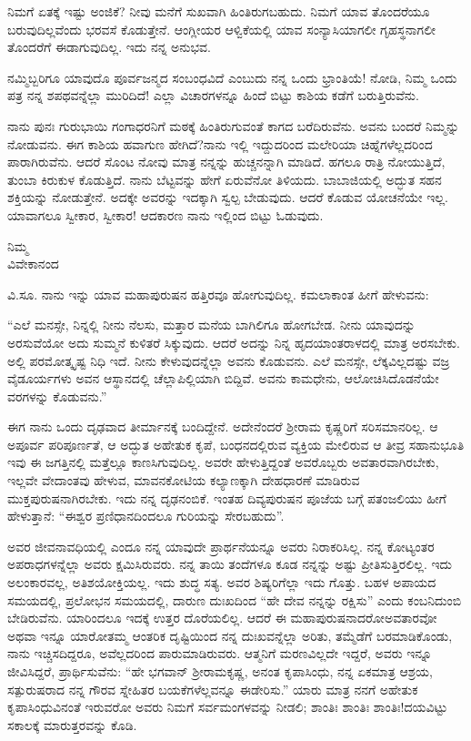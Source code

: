 ನಿಮಗೆ ಏತಕ್ಕೆ ಇಷ್ಟು ಅಂಜಿಕೆ? ನೀವು ಮನೆಗೆ ಸುಖವಾಗಿ ಹಿಂತಿರುಗಬಹುದು. ನಿಮಗೆ ಯಾವ ತೊಂದರೆಯೂ ಬರುವುದಿಲ್ಲವೆಂದು ಭರವಸೆ ಕೊಡುತ್ತೇನೆ. ಆಂಗ್ಲೀಯರ ಆಳ್ವಿಕೆಯಲ್ಲಿ ಯಾವ ಸಂನ್ಯಾಸಿಯಾಗಲೀ ಗೃಹಸ್ಥನಾಗಲೀ ತೊಂದರೆಗೆ ಈಡಾಗುವುದಿಲ್ಲ. ಇದು ನನ್ನ ಅನುಭವ.

ನಮ್ಮಿಬ್ಬರಿಗೂ ಯಾವುದೊ ಪೂರ್ವಜನ್ಮದ ಸಂಬಂಧವಿದೆ ಎಂಬುದು ನನ್ನ ಒಂದು ಭ್ರಾಂತಿಯೆ! ನೋಡಿ, ನಿಮ್ಮ ಒಂದು ಪತ್ರ ನನ್ನ ಶಪಥವನ್ನೆಲ್ಲಾ ಮುರಿದಿದೆ! ಎಲ್ಲಾ ವಿಚಾರಗಳನ್ನೂ ಹಿಂದೆ ಬಿಟ್ಟು ಕಾಶಿಯ ಕಡೆಗೆ ಬರುತ್ತಿರುವೆನು.

ನಾನು ಪುನಃ ಗುರುಭಾಯಿ ಗಂಗಾಧರನಿಗೆ ಮಠಕ್ಕೆ ಹಿಂತಿರುಗುವಂತೆ ಕಾಗದ ಬರೆದಿರುವೆನು. ಅವನು ಬಂದರೆ ನಿಮ್ಮನ್ನು ನೋಡುವನು. ಈಗ ಕಾಶಿಯ ಹವಾಗುಣ ಹೇಗಿದೆ?ನಾನು ಇಲ್ಲಿ ಇದ್ದುದರಿಂದ ಮಲೇರಿಯಾ ಚಿಹ್ನೆಗಳೆಲ್ಲದರಿಂದ ಪಾರಾಗಿರುವೆನು. ಆದರೆ ಸೊಂಟ ನೋವು ಮಾತ್ರ ನನ್ನನ್ನು ಹುಚ್ಚನನ್ನಾಗಿ ಮಾಡಿದೆ. ಹಗಲೂ ರಾತ್ರಿ ನೋಯುತ್ತಿದೆ, ತುಂಬಾ ಕಿರುಕುಳ ಕೊಡುತ್ತಿದೆ. ನಾನು ಬೆಟ್ಟವನ್ನು ಹೇಗೆ ಏರುವೆನೋ ತಿಳಿಯದು. ಬಾಬಾಜಿಯಲ್ಲಿ ಅದ್ಭುತ ಸಹನ ಶಕ್ತಿಯನ್ನು ನೋಡುತ್ತೇನೆ. ಅದಕ್ಕೇ ಅವರನ್ನು ಇದಕ್ಕಾಗಿ ಸ್ವಲ್ಪ ಬೇಡುವುದು. ಆದರೆ ಕೊಡುವ ಯೋಚನೆಯೇ ಇಲ್ಲ. ಯಾವಾಗಲೂ ಸ್ವೀಕಾರ, ಸ್ವೀಕಾರ! ಆದಕಾರಣ ನಾನು ಇಲ್ಲಿಂದ ಬಿಟ್ಟು ಓಡುವುದು.
\vspace{-0.3cm}

{\flushright
ನಿಮ್ಮ\\ವಿವೇಕಾನಂದ\par}

ವಿ.ಸೂ. \enginline{-}ನಾನು ಇನ್ನು ಯಾವ ಮಹಾಪುರುಷನ ಹತ್ತಿರವೂ ಹೋಗುವುದಿಲ್ಲ. ಕಮಲಾಕಾಂತ ಹೀಗೆ ಹೇಳುವನು:

“ಎಲೆ ಮನಸ್ಸೇ, ನಿನ್ನಲ್ಲಿ ನೀನು ನೆಲಸು, ಮತ್ತಾರ ಮನೆಯ ಬಾಗಿಲಿಗೂ ಹೋಗಬೇಡ. ನೀನು ಯಾವುದನ್ನು ಅರಸುವೆಯೋ ಅದು ಸುಮ್ಮನೆ ಕುಳಿತರೆ ಸಿಕ್ಕುವುದು. ಆದರೆ ಅದನ್ನು ನಿನ್ನ ಹೃದಯಾಂತರಾಳದಲ್ಲಿ ಮಾತ್ರ ಅರಸಬೇಕು. ಅಲ್ಲಿ ಪರಮೋತ್ಕೃಷ್ಟ ನಿಧಿ ಇದೆ. ನೀನು ಕೇಳುವುದನ್ನೆಲ್ಲಾ ಅವನು ಕೊಡುವನು. ಎಲೆ ಮನಸ್ಸೇ, ಲೆಕ್ಕವಿಲ್ಲದಷ್ಟು ವಜ್ರ ವೈಡೂರ್ಯಗಳು ಅವನ ಆಸ್ಥಾನದಲ್ಲಿ ಚೆಲ್ಲಾಪಿಲ್ಲಿಯಾಗಿ ಬಿದ್ದಿವೆ. ಅವನು ಕಾಮಧೇನು, ಆಲೋಚಿಸಿದೊಡನೆಯೇ ವರಗಳನ್ನು ಕೊಡುವನು.”

ಈಗ ನಾನು ಒಂದು ದೃಢವಾದ ತೀರ್ಮಾನಕ್ಕೆ ಬಂದಿದ್ದೇನೆ. ಅದೇನೆಂದರೆ ಶ‍್ರೀರಾಮ ಕೃಷ್ಣರಿಗೆ ಸರಿಸಮಾನರಿಲ್ಲ. ಆ ಅಪೂರ್ವ ಪರಿಪೂರ್ಣತೆ, ಆ ಅದ್ಭುತ ಅಹೇತುಕ ಕೃಪೆ, ಬಂಧನದಲ್ಲಿರುವ ವ್ಯಕ್ತಿಯ ಮೇಲಿರುವ ಆ ತೀವ್ರ ಸಹಾನುಭೂತಿ ಇವು ಈ ಜಗತ್ತಿನಲ್ಲಿ ಮತ್ತೆಲ್ಲೂ ಕಾಣಸಿಗುವುದಿಲ್ಲ. ಅವರೇ ಹೇಳುತ್ತಿದ್ದಂತೆ ಅವರೊಬ್ಬರು ಅವತಾರವಾಗಿರಬೇಕು, ಇಲ್ಲವೇ ವೇದಾಂತವು ಹೇಳುವ, ಮಾವನಕೋಟಿಯ ಕಲ್ಯಾಣಕ್ಕಾಗಿ ದೇಹಧಾರಣೆ ಮಾಡಿರುವ ಮುಕ್ತಪುರುಷನಾಗಿರಬೇಕು. ಇದು ನನ್ನ ದೃಢನಂಬಿಕೆ. ಇಂತಹ ದಿವ್ಯಪುರುಷನ ಪೂಜೆಯ ಬಗ್ಗೆ ಪತಂಜಲಿಯು ಹೀಗೆ ಹೇಳುತ್ತಾನೆ: “ಈಶ್ವರ ಪ್ರಣಿಧಾನದಿಂದಲೂ ಗುರಿಯನ್ನು ಸೇರಬಹುದು”.

ಅವರ ಜೀವನಾವಧಿಯಲ್ಲಿ ಎಂದೂ ನನ್ನ ಯಾವುದೇ ಪ್ರಾರ್ಥನೆಯನ್ನೂ ಅವರು ನಿರಾಕರಿಸಿಲ್ಲ. ನನ್ನ ಕೋಟ್ಯಂತರ ಅಪರಾಧಗಳನ್ನೆಲ್ಲಾ ಅವರು ಕ್ಷಮಿಸಿರುವರು. ನನ್ನ ತಾಯಿ ತಂದೆಗಳೂ ಕೂಡ ನನ್ನನ್ನು ಅಷ್ಟು ಪ್ರೀತಿಸುತ್ತಿರಲಿಲ್ಲ. ಇದು ಅಲಂಕಾರವಲ್ಲ, ಅತಿಶಯೋಕ್ತಿಯಲ್ಲ. ಇದು ಶುದ್ಧ ಸತ್ಯ. ಅವರ ಶಿಷ್ಯರಿಗೆಲ್ಲಾ ಇದು ಗೊತ್ತು. ಬಹಳ ಅಪಾಯದ ಸಮಯದಲ್ಲಿ, ಪ್ರಲೋಭನ ಸಮಯದಲ್ಲಿ, ದಾರುಣ ದುಃಖದಿಂದ “ಹೇ ದೇವ ನನ್ನನ್ನು ರಕ್ಷಿಸು” ಎಂದು ಕಂಬನಿದುಂಬಿ ಬೇಡಿರುವೆನು. ಯಾರಿಂದಲೂ ಇದಕ್ಕೆ ಉತ್ತರ ದೊರೆಯಲಿಲ್ಲ. ಆದರೆ ಈ ಮಹಾಪುರುಷನಾದರೋ\enginline{-}ಅವತಾರವೋ ಅಥವಾ ಇನ್ನೂ ಯಾರೋ\enginline{-}ತಮ್ಮ ಆಂತರಿಕ ದೃಷ್ಟಿಯಿಂದ ನನ್ನ ದುಃಖವನ್ನೆಲ್ಲಾ ಅರಿತು, ತಮ್ಮೆಡೆಗೆ ಬರಮಾಡಿಕೊಂಡು, ನಾನು ಇಚ್ಚಿಸದಿದ್ದರೂ, ಅವೆಲ್ಲದರಿಂದ ಪಾರುಮಾಡಿರುವರು. ಆತ್ಮನಿಗೆ ಮರಣವಿಲ್ಲದೇ ಇದ್ದರೆ, ಅವರು ಇನ್ನೂ ಜೀವಿಸಿದ್ದರೆ, ಪ್ರಾರ್ಥಿಸುವೆನು: “ಹೇ ಭಗವಾನ್ ಶ‍್ರೀರಾಮಕೃಷ್ಣ, ಅನಂತ ಕೃಪಾಸಿಂಧು, ನನ್ನ ಏಕಮಾತ್ರ ಆಶ್ರಯ, ಸತ್ಪುರುಷರಾದ ನನ್ನ ಗೌರವ ಸ್ನೇಹಿತರ ಬಯಕೆಗಳೆಲ್ಲವನ್ನೂ ಈಡೇರಿಸು.” ಯಾರು ಮಾತ್ರ ನನಗೆ ಅಹೇತುಕ ಕೃಪಾಸಿಂಧುವಿನಂತೆ ಇರುವರೋ ಅವರು ನಿಮಗೆ ಸರ್ವಮಂಗಳವನ್ನು ನೀಡಲಿ; ಶಾಂತಿಃ ಶಾಂತಿಃ ಶಾಂತಿಃ!ದಯವಿಟ್ಟು ಸಕಾಲಕ್ಕೆ ಮಾರುತ್ತರವನ್ನು ಕೊಡಿ.

